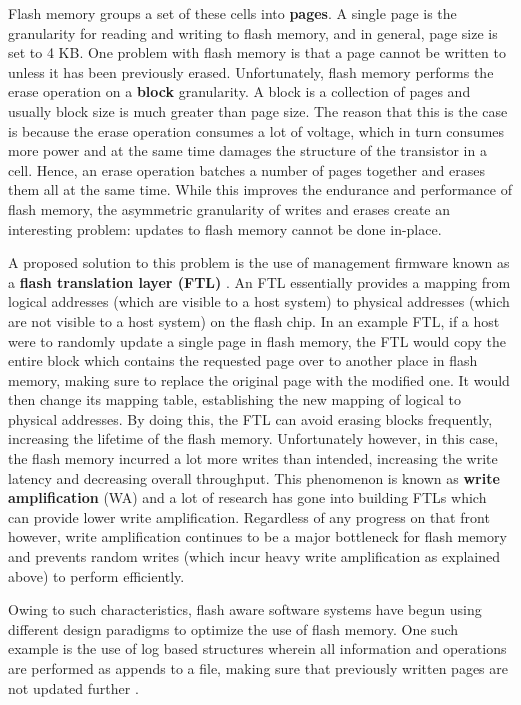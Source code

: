 \documentclass[10pt, author, twocolumn]{article}
\begin{document}
Flash memory groups a set of these cells into \textbf{pages}. A single page is the granularity for reading and writing to flash memory, and in general, page size is set to 4 KB. One problem with flash memory is that a page cannot be written to unless it has been previously erased. Unfortunately, flash memory performs the erase operation on a \textbf{block} granularity. A block is a collection of pages and usually block size is much greater than page size. The reason that this is the case is because the erase operation consumes a lot of voltage, which in turn consumes more power and at the same time damages the structure of the transistor in a cell. Hence, an erase operation batches a number of pages together and erases them all at the same time. While this improves the endurance and performance of flash memory, the asymmetric granularity of writes and erases create an interesting problem: updates to flash memory cannot be done in-place.

A proposed solution to this problem is the use of management firmware known as a \textbf{flash translation layer (FTL)} \cite{kim2002space}. An FTL essentially provides a mapping from logical addresses (which are visible to a host system) to physical addresses (which are not visible to a host system) on the flash chip. In an example FTL, if a host were to randomly update a single page in flash memory, the FTL would copy the entire block which contains the requested page over to another place in flash memory, making sure to replace the original page with the modified one. It would then change its mapping table, establishing the new mapping of logical to physical addresses. By doing this, the FTL can avoid erasing blocks frequently, increasing the lifetime of the flash memory. Unfortunately however, in this case, the flash memory incurred a lot more writes than intended, increasing the write latency and decreasing overall throughput. This phenomenon is known as \textbf{write amplification} (WA) and a lot of research has gone into building FTLs which can provide lower write amplification. Regardless of any progress on that front however, write amplification continues to be a major bottleneck for flash memory and prevents random writes (which incur heavy write amplification as explained above) to perform efficiently.

Owing to such characteristics, flash aware software systems have begun using different design paradigms to optimize the use of flash memory. One such example is the use of log based structures wherein all information and operations are performed as appends to a file, making sure that previously written pages are not updated further \cite{rosenblum1992design}. 
\end{document}
